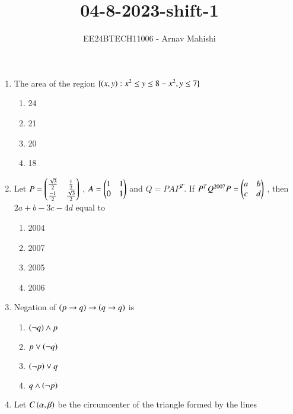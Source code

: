 \documentclass[journal]{IEEEtran}
\begin{document}

\vspace{3cm}

\title{04-8-2023-shift-1}
\author{EE24BTECH11006 - Arnav Mahishi}
{\let\newpage\relax\maketitle}
\begin{enumerate}
\item{
The area of the region $\{\left(x,y\right):x^2\leq y \leq 8-x^2,y \leq 7\}$
\begin{multicols}{4}
\begin{enumerate}
\item24
\item21
\item20
\item18
\end{enumerate}
\end{multicols}
}
\item{
Let $P=\begin{pmatrix}\frac{\sqrt{3}}{2}&\frac{1}{2}\\\frac{-1}{2}&\frac{\sqrt{3}}{2}\end{pmatrix}$ , $A=\begin{pmatrix}1&1\\0&1\end{pmatrix}$ and $Q=PAP^T$. If $P^TQ^{2007}P=\begin{pmatrix}a&b\\c&d\end{pmatrix}$ , then $2a+b-3c-4d$ equal to
\begin{multicols}{4}
\begin{enumerate}
\item 2004
\item 2007
\item 2005
\item 2006
\end{enumerate}
\end{multicols}}
\item{
Negation of $\left(p\rightarrow q\right)\rightarrow\left(q\rightarrow q\right)$ is 
\begin{multicols}{4}
\begin{enumerate}
\item $\left(\neg q\right)\wedge p$
\item $p\vee\left(\neg q\right)$
\item $\left(\neg p\right)\vee q$
\item $q\wedge\left(\neg p\right)$
\end{enumerate}
\end{multicols}
}
\item{
Let $C\left(\alpha,\beta\right)$ be the circumcenter of the triangle formed by the lines\\
\begin{align*}

\end{align*}}
\end{enumerate}
\end{document}
